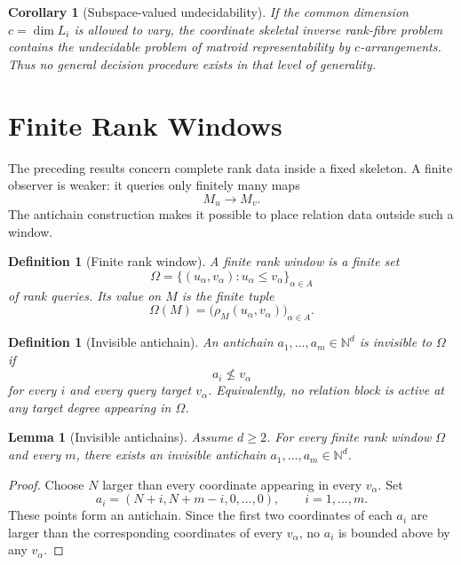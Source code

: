 \documentclass[11pt]{article}
\newtheorem{lemma}[theorem]{Lemma}
\newtheorem{corollary}[theorem]{Corollary}
\newtheorem{definition}[theorem]{Definition}
\begin{document}
\begin{corollary}[Subspace-valued undecidability]
If the common dimension \(c=\dim L_i\) is allowed to vary, the coordinate skeletal inverse rank-fibre problem contains the undecidable problem of matroid representability by \(c\)-arrangements. Thus no general decision procedure exists in that level of generality.
\end{corollary}

\section{Finite Rank Windows}

The preceding results concern complete rank data inside a fixed skeleton. A finite observer is weaker: it queries only finitely many maps
\[
M_u\longrightarrow M_v.
\]
The antichain construction makes it possible to place relation data outside such a window.

\begin{definition}[Finite rank window]
A finite rank window is a finite set
\[
\Omega=\{(u_\alpha,v_\alpha):u_\alpha\le v_\alpha\}_{\alpha\in A}
\]
of rank queries. Its value on \(M\) is the finite tuple
\[
\Omega(M)=\big(\rho_M(u_\alpha,v_\alpha)\big)_{\alpha\in A}.
\]
\end{definition}

\begin{definition}[Invisible antichain]
An antichain \(a_1,\ldots,a_m\in\mathbb N^d\) is invisible to \(\Omega\) if
\[
a_i\not\le v_\alpha
\]
for every \(i\) and every query target \(v_\alpha\). Equivalently, no relation block is active at any target degree appearing in \(\Omega\).
\end{definition}

\begin{lemma}[Invisible antichains]
Assume \(d\ge2\). For every finite rank window \(\Omega\) and every \(m\), there exists an invisible antichain \(a_1,\ldots,a_m\in\mathbb N^d\).
\end{lemma}

\begin{proof}
Choose \(N\) larger than every coordinate appearing in every \(v_\alpha\). Set
\[
a_i=(N+i,N+m-i,0,\ldots,0),
\qquad i=1,\ldots,m.
\]
These points form an antichain. Since the first two coordinates of each \(a_i\) are larger than the corresponding coordinates of every \(v_\alpha\), no \(a_i\) is bounded above by any \(v_\alpha\).
\end{proof}
\end{document}
